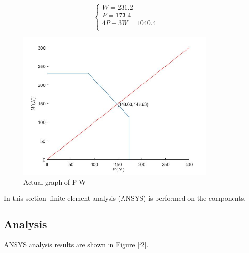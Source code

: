 $$
\left\{ \begin{array}{l}
	W=231.2\\
	P=173.4\\
	4P+3W=1040.4\\
\end{array} \right. 
$$


\begin{figure}[htbp]
    \centering
    \includegraphics[width=10cm]{./fig/15.jpg}
    \caption{Actual graph of P-W}
    \label{f3}
\end{figure}










\iffalse

In this section, finite element analysis (ANSYS) is performed on the components.

\subsection*{Analysis}

ANSYS analysis results are shown in Figure \ref{f2}.

